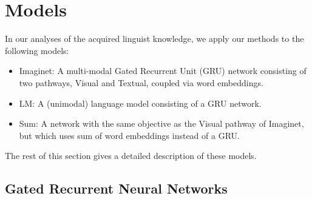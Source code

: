 \section{Models}

In our analyses of the acquired linguist knowledge, we apply our methods to the following models:
\begin{itemize}
\item {\sc Imaginet}: A multi-modal Gated Recurrent Unit (GRU) network consisting of two
  pathways, {\sc Visual} and {\sc Textual}, coupled via word embeddings.
\item {\sc LM}: A (unimodal) language model consisting of a GRU network.
\item {\sc Sum}: A network with the same objective as the {\sc Visual}
  pathway of {\sc Imaginet}, but which uses sum of word embeddings
  instead of a GRU.
\end{itemize}
The rest of this section gives a detailed description of these models.

\subsection{Gated Recurrent Neural Networks}
\label{sec:gru}

